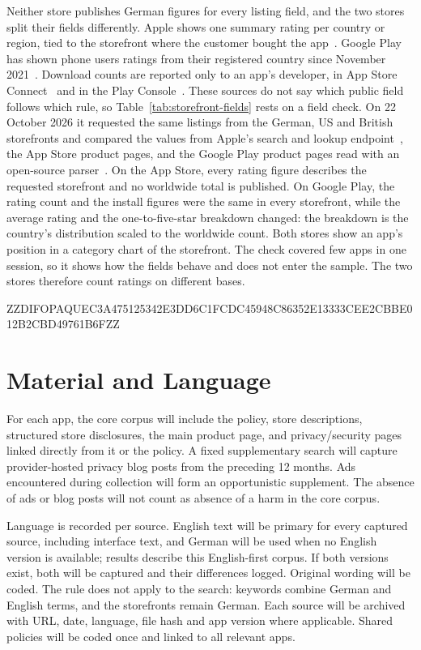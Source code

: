 \documentclass[twoside,its]{bossthesis}
\begin{document}
Neither store publishes German figures for every listing field, and the two
stores split their fields differently. Apple shows one summary rating per
country or region, tied to the storefront where the customer bought the
app~\parencite{apple2026ratingsoverview}. Google Play has shown phone users
ratings from their registered country since November
2021~\parencite{grinsted2021making}. Download counts are reported only to an
app's developer, in App Store Connect~\parencite{apple2026acquisition} and in the
Play Console~\parencite{google2026playstatistics}. These sources do not say
which public field follows which rule, so Table~\ref{tab:storefront-fields}
rests on a field check. On 22 October 2026 it requested the same listings from
the German, US and British storefronts and compared the values from Apple's
search and lookup endpoint~\parencite{apple2022itunessearch}, the App Store
product pages, and the Google Play product pages read with an open-source
parser~\parencite{jomingyu2024googleplayscraper}. On the App Store, every rating
figure describes the requested storefront and no worldwide total is published.
On Google Play, the rating count and the install figures were the same in every
storefront, while the average rating and the one-to-five-star breakdown
changed: the breakdown is the country's distribution scaled to the worldwide
count. Both stores show an app's position in a category chart of the
storefront. The check covered few apps in one session, so it shows how the
fields behave and does not enter the sample. The two stores therefore count
ratings on different bases.



ZZDIFOPAQUEC3A475125342E3DD6C1FCDC45948C86352E13333CEE2CBBE012B2CBD49761B6FZZ



\section{Material and Language} For each app, the core corpus will include
the policy, store descriptions, structured store disclosures, the main product
page, and privacy/security pages linked directly from it or the policy. A
fixed supplementary search will capture provider-hosted privacy blog posts
from the preceding 12 months. Ads encountered during collection will form an
opportunistic supplement. The absence of ads or blog posts will not count as
absence of a harm in the core corpus.

Language is recorded per source. English text will be primary for every
captured source, including interface text, and German will be used when no
English version is available; results describe this English-first corpus. If
both versions exist, both will be captured and their differences logged.
Original wording will be coded. The rule does not apply to the search:
keywords combine German and English terms, and the storefronts remain German.
Each source will be archived with URL, date, language, file hash and app
version where applicable. Shared policies will be coded
once and linked to all relevant apps.
\end{document}
